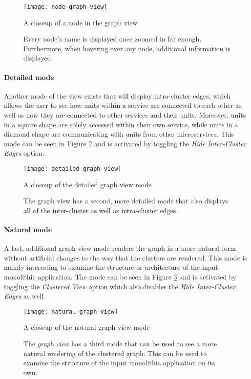 \documentclass[12pt,a4paper]{report}
\begin{document}
\begin{figure}[htbp]
\centering
\texttt{[image: node-graph-view]}
\caption{A closeup of a node in the graph view}
\caption*{\centering
  Every node's name is displayed once zoomed in far enough.
  Furthermore, when hovering over any node, additional information is displayed.
}
\label{fig:node-graph-view}
\end{figure}

\paragraph{Detailed mode}
Another mode of the view exists that
will display intra-cluster edges, which allows the user to see how units within
a service are connected to each other as well as how they are connected to
other services and their units. Moreover, units in a square shape are solely
accessed within their own service, while units in a diamond shape are
communicating with units from other microservices. This mode can be seen in
Figure \ref{fig:detailed-graph-view} and is activated by toggling the
\textit{Hide Inter-Cluster Edges} option.

\begin{figure}[htbp]
\centering
\texttt{[image: detailed-graph-view]}
\caption{A closeup of the detailed graph view mode}
\caption*{\centering
  The graph view has a second, more detailed mode that also displays
  all of the inter-cluster as well as intra-cluster edges.
}
\label{fig:detailed-graph-view}
\end{figure}

\paragraph{Natural mode}
A last, additional graph view mode renders the graph
in a more natural form without artificial changes to the way that the clusters
are rendered. This mode is mainly interesting to examine the structure or
architecture of the input monolithic application. The mode can be seen in
Figure \ref{fig:natural-graph-view} and is activated by toggling the
\textit{Clustered View} option which also disables the
\textit{Hide Inter-Cluster Edges} as well.

\begin{figure}[htbp]
\centering
\texttt{[image: natural-graph-view]}
\caption{A closeup of the natural graph view mode}
\caption*{\centering
  The \textit{graph view} has a third mode that can be used to see a more
  natural rendering of the clustered graph. This can be used to examine
  the structure of the input monolithic application on its own.
}
\label{fig:natural-graph-view}
\end{figure}
\end{document}

